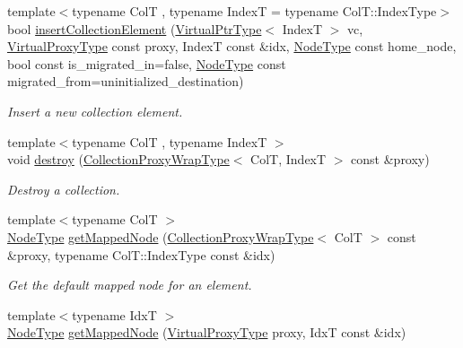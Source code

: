 \begin{DoxyCompactItemize}
{\footnotesize template$<$typename ColT , typename IndexT  = typename Col\+T\+::\+Index\+Type$>$ }\\bool \hyperlink{structvt_1_1vrt_1_1collection_1_1_collection_manager_a86abf996b403b4e6325e26cf577440ee}{insert\+Collection\+Element} (\hyperlink{structvt_1_1vrt_1_1collection_1_1_collection_manager_a086cab4af6af4f869fbf8814c3a9a6a4}{Virtual\+Ptr\+Type}$<$ IndexT $>$ vc, \hyperlink{namespacevt_a1b417dd5d684f045bb58a0ede70045ac}{Virtual\+Proxy\+Type} const proxy, IndexT const \&idx, \hyperlink{namespacevt_a866da9d0efc19c0a1ce79e9e492f47e2}{Node\+Type} const home\+\_\+node, bool const is\+\_\+migrated\+\_\+in=false, \hyperlink{namespacevt_a866da9d0efc19c0a1ce79e9e492f47e2}{Node\+Type} const migrated\+\_\+from=uninitialized\+\_\+destination)
\begin{DoxyCompactList}\small\item\em Insert a new collection element. \end{DoxyCompactList}\item 
{\footnotesize template$<$typename ColT , typename IndexT $>$ }\\void \hyperlink{structvt_1_1vrt_1_1collection_1_1_collection_manager_ae6e458293d04d8b29697fa0584c84c67}{destroy} (\hyperlink{structvt_1_1vrt_1_1collection_1_1_collection_manager_a56458ed7f9bb22b631b9b3a745f42f94}{Collection\+Proxy\+Wrap\+Type}$<$ ColT, IndexT $>$ const \&proxy)
\begin{DoxyCompactList}\small\item\em Destroy a collection. \end{DoxyCompactList}\item 
{\footnotesize template$<$typename ColT $>$ }\\\hyperlink{namespacevt_a866da9d0efc19c0a1ce79e9e492f47e2}{Node\+Type} \hyperlink{structvt_1_1vrt_1_1collection_1_1_collection_manager_ab92af61f5466dd4a1210bd6f2f1bb153}{get\+Mapped\+Node} (\hyperlink{structvt_1_1vrt_1_1collection_1_1_collection_manager_a56458ed7f9bb22b631b9b3a745f42f94}{Collection\+Proxy\+Wrap\+Type}$<$ ColT $>$ const \&proxy, typename Col\+T\+::\+Index\+Type const \&idx)
\begin{DoxyCompactList}\small\item\em Get the default mapped node for an element. \end{DoxyCompactList}\item 
{\footnotesize template$<$typename IdxT $>$ }\\\hyperlink{namespacevt_a866da9d0efc19c0a1ce79e9e492f47e2}{Node\+Type} \hyperlink{structvt_1_1vrt_1_1collection_1_1_collection_manager_a2356c42f2ca0effeca67b6bc2813fc29}{get\+Mapped\+Node} (\hyperlink{namespacevt_a1b417dd5d684f045bb58a0ede70045ac}{Virtual\+Proxy\+Type} proxy, IdxT const \&idx)

\end{DoxyCompactItemize}
